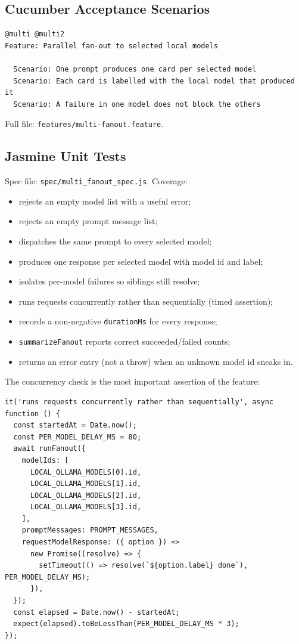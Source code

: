 \documentclass[11pt]{article}
\begin{document}
\subsection{Cucumber Acceptance Scenarios}

\begin{lstlisting}
@multi @multi2
Feature: Parallel fan-out to selected local models

  Scenario: One prompt produces one card per selected model
  Scenario: Each card is labelled with the local model that produced it
  Scenario: A failure in one model does not block the others
\end{lstlisting}

Full file: \texttt{features/multi-fanout.feature}.

\subsection{Jasmine Unit Tests}

Spec file: \texttt{spec/multi\_fanout\_spec.js}.  Coverage:

\begin{itemize}[leftmargin=*]
  \item rejects an empty model list with a useful error;
  \item rejects an empty prompt message list;
  \item dispatches the same prompt to every selected model;
  \item produces one response per selected model with model id and
    label;
  \item isolates per-model failures so siblings still resolve;
  \item runs requests concurrently rather than sequentially
    (timed assertion);
  \item records a non-negative \texttt{durationMs} for every
    response;
  \item \texttt{summarizeFanout} reports correct succeeded/failed
    counts;
  \item returns an error entry (not a throw) when an unknown model id
    sneaks in.
\end{itemize}

The concurrency check is the most important assertion of the feature:

\begin{lstlisting}
it('runs requests concurrently rather than sequentially', async function () {
  const startedAt = Date.now();
  const PER_MODEL_DELAY_MS = 80;
  await runFanout({
    modelIds: [
      LOCAL_OLLAMA_MODELS[0].id,
      LOCAL_OLLAMA_MODELS[1].id,
      LOCAL_OLLAMA_MODELS[2].id,
      LOCAL_OLLAMA_MODELS[3].id,
    ],
    promptMessages: PROMPT_MESSAGES,
    requestModelResponse: ({ option }) =>
      new Promise((resolve) => {
        setTimeout(() => resolve(`${option.label} done`), PER_MODEL_DELAY_MS);
      }),
  });
  const elapsed = Date.now() - startedAt;
  expect(elapsed).toBeLessThan(PER_MODEL_DELAY_MS * 3);
});
\end{lstlisting}
\end{document}
